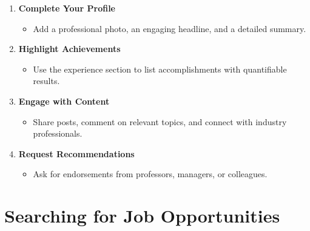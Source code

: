 \documentclass[
  letterpaper,
  DIV=11,
  numbers=noendperiod]{scrreprt}
\providecommand{\tightlist}{%
  \setlength{\itemsep}{0pt}\setlength{\parskip}{0pt}}\usepackage{longtable,booktabs,array}
\begin{document}
\begin{enumerate}
\def\labelenumi{\arabic{enumi}.}
\item
  \textbf{Complete Your Profile}

  \begin{itemize}
  \tightlist
  \item
    Add a professional photo, an engaging headline, and a detailed
    summary.
  \end{itemize}
\item
  \textbf{Highlight Achievements}

  \begin{itemize}
  \tightlist
  \item
    Use the experience section to list accomplishments with quantifiable
    results.
  \end{itemize}
\item
  \textbf{Engage with Content}

  \begin{itemize}
  \tightlist
  \item
    Share posts, comment on relevant topics, and connect with industry
    professionals.
  \end{itemize}
\item
  \textbf{Request Recommendations}

  \begin{itemize}
  \tightlist
  \item
    Ask for endorsements from professors, managers, or colleagues.
  \end{itemize}
\end{enumerate}

\section{Searching for Job
Opportunities}\label{searching-for-job-opportunities}
\end{document}

